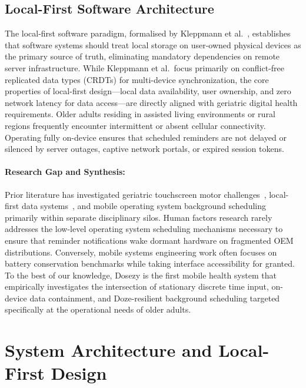 \documentclass[11pt,a4paper]{article}
\begin{document}
\subsection{Local-First Software Architecture}

The local-first software paradigm, formalised by Kleppmann et al.~\cite{kleppmann2019local}, establishes that software systems should treat local storage on user-owned physical devices as the primary source of truth, eliminating mandatory dependencies on remote server infrastructure. While Kleppmann et al.\ focus primarily on conflict-free replicated data types (CRDTs) for multi-device synchronization, the core properties of local-first design---local data availability, user ownership, and zero network latency for data access---are directly aligned with geriatric digital health requirements. Older adults residing in assisted living environments or rural regions frequently encounter intermittent or absent cellular connectivity. Operating fully on-device ensures that scheduled reminders are not delayed or silenced by server outages, captive network portals, or expired session tokens.

\paragraph{Research Gap and Synthesis:} Prior literature has investigated geriatric touchscreen motor challenges~\cite{trewin2013physical,siek2006fat}, local-first data systems~\cite{kleppmann2019local}, and mobile operating system background scheduling~\cite{google2024offline} primarily within separate disciplinary silos. Human factors research rarely addresses the low-level operating system scheduling mechanisms necessary to ensure that reminder notifications wake dormant hardware on fragmented OEM distributions. Conversely, mobile systems engineering work often focuses on battery conservation benchmarks while taking interface accessibility for granted. To the best of our knowledge, Dosezy is the first mobile health system that empirically investigates the intersection of stationary discrete time input, on-device data containment, and Doze-resilient background scheduling targeted specifically at the operational needs of older adults.

\section{System Architecture and Local-First Design}
\label{sec:system_architecture}
\end{document}
